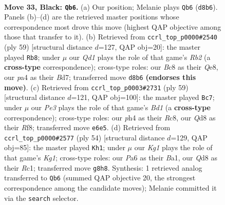 \documentclass[11pt]{article}
\begin{document}
\clearpage

\begin{figure}[p]\centering
\begin{subfigure}{0.46\textwidth}\centering
\resizebox{\linewidth}{!}{%
\newchessgame
\chessboard[
  setfen={r1bq2k1/3pr1bp/p3p3/5p1B/P1np1Q1P/5N2/1P3P2/RNBR1K2 b - - 1 33},
  showmover=false,
  pgfstyle=straightmove, color=movearrow, markmove={d8-b6}
]}
\caption{}
\end{subfigure}\hfill
\begin{subfigure}{0.46\textwidth}\centering
\resizebox{\linewidth}{!}{%
\newchessgame
\chessboard[
  setfen={4q3/1r1bbppk/3pp2p/1p2n3/1N2P3/P1R4P/1P2BPP1/2BQ2K1 b - - 2 30},
  showmover=false,
  pgfstyle=straightmove, color=movearrow, markmove={b7-b8}
]}
\caption{}
\end{subfigure}
\\[4pt]
\begin{subfigure}{0.46\textwidth}\centering
\resizebox{\linewidth}{!}{%
\newchessgame
\chessboard[
  setfen={2rb1r1k/1p5p/2b1q1p1/p2pPp1P/P2Q4/2B1N1P1/1P2BP2/R5K1 b - - 1 30},
  showmover=false,
  pgfstyle=straightmove, color=movearrow, markmove={d8-c7}
]}
\caption{}
\end{subfigure}\hfill
\begin{subfigure}{0.46\textwidth}\centering
\resizebox{\linewidth}{!}{%
\newchessgame
\chessboard[
  setfen={2r3k1/b2bqppp/8/p1P2n2/5N2/1P3PP1/P4QBP/B1R3K1 w - - 3 28},
  showmover=false,
  pgfstyle=straightmove, color=movearrow, markmove={g1-h1}
]}
\caption{}
\end{subfigure}
\caption{\textbf{Move 33, Black: \texttt{Qb6}.} (a) Our position; Melanie plays \texttt{Qb6} (\texttt{d8b6}). Panels (b)--(d) are the retrieved master positions whose correspondence most drove this move (highest QAP objective among those that transfer to it). (b) Retrieved from \texttt{ccrl\_top\_p0000\#2540} (ply 59) [structural distance $d$=127, QAP obj=20]: the master played \texttt{Rb8}; under $\mu$ our \emph{Qd1} plays the role of that game's \emph{Rb2} (a \textbf{cross-type} correspondence); cross-type roles: our \emph{B}c8 as their \emph{Q}e8, our \emph{p}a4 as their \emph{B}d7; transferred move \texttt{d8b6} \textbf{(endorses this move)}. (c) Retrieved from \texttt{ccrl\_top\_p0003\#2731} (ply 59) [structural distance $d$=121, QAP obj=100]: the master played \texttt{Bc7}; under $\mu$ our \emph{Pe3} plays the role of that game's \emph{Bd1} (a \textbf{cross-type} correspondence); cross-type roles: our \emph{p}h4 as their \emph{R}c8, our \emph{Q}d8 as their \emph{R}f8; transferred move \texttt{e6e5}. (d) Retrieved from \texttt{ccrl\_top\_p0000\#2577} (ply 54) [structural distance $d$=129, QAP obj=85]: the master played \texttt{Kh1}; under $\mu$ our \emph{Kg1} plays the role of that game's \emph{Kg1}; cross-type roles: our \emph{P}a6 as their \emph{B}a1, our \emph{Q}d8 as their \emph{R}c1; transferred move \texttt{g8h8}. Synthesis: 1 retrieved analog transferred to \texttt{Qb6} (summed QAP objective 20, the strongest correspondence among the candidate moves); Melanie committed it via the \texttt{search} selector.}
\label{fig:thought-m65}
\end{figure}
\end{document}

